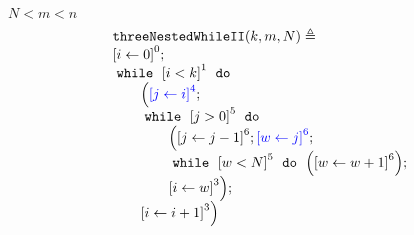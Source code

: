 \begin{example}
    \label{ex:threeNestedWhileII}
    $N < m < n$\\
    \[
    \begin{array}{l}
        \kw{threeNestedWhileII}(k, m, N) \triangleq \\
        \clabel{ \assign{i}{0} }^{0} ; \\
            \ewhile ~ \clabel{i < k}^{1} ~ \edo ~ \\
            \qquad \Big(
             \highlight{\clabel{\assign{j}{i}}^{4}} ;\\
             \qquad \ewhile ~ \clabel{j > 0}^{5} ~ \edo ~ \\
             \qquad \qquad \Big(
              \clabel{\assign{j}{j-1}}^{6};
              \highlight{\clabel{\assign{w}{j}}^{6}};\\
              \qquad \qquad \ewhile ~ \clabel{w < N}^{5} ~ \edo ~
              \Big(
                \clabel{\assign{w}{w + 1}}^{6}
                  \Big); \\
                  \qquad \qquad \clabel{\assign{i}{w}}^{3}
                  \Big); \\
                  \qquad \clabel{\assign{i}{i+1}}^{3}
              \Big)
        \end{array}
    \]
\end{example}

